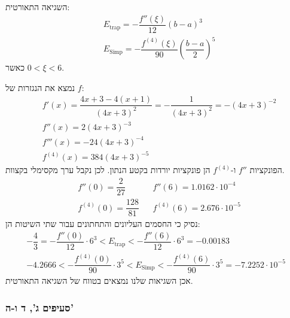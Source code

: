 \documentclass[
  a4paper,
]{article}
\begin{document}
השגיאה התאורטית: \[\begin{aligned}
 & E_{\text{trap}}=-\dfrac{f''(\xi)}{12}(b-a)^{3} \\[2ex]
 & E_{\text{Simp}}=-\dfrac{f^{(4)}(\xi)}{90}\left( \dfrac{b-a}{2} \right)^{5}
\end{aligned} \] כאשר \(0<\xi<6\).

נמצא את הנגזרות של \(f\): \[\begin{aligned}
 & f'(x)=\dfrac{4x+3-4(x+1)}{(4x+3)^{2}}=-\dfrac{1}{(4x+3)^{2}} =-(4x+3)^{-2}\\[1ex]
 & f''(x)=2(4x+3)^{-3} \\[1ex]
 & f'''(x)=-24(4x+3)^{-4} \\[1ex]
 & f^{(4)}(x)=384(4x+3)^{-5}
\end{aligned}\] הפונקציות \(f''\) ו-\(f^{(4)}\) הן פונקציות יורדות בקטע
הנתון. לכן נקבל ערך מקסימלי בקצוות. \[\begin{aligned}
 & f''(0)=\dfrac{2}{27} &  & f''(6)=1.0162\cdot 10^{-4}\\
 & f^{(4)}(0)=\dfrac{128}{81} &  & f^{(4)}(6)=2.676\cdot 10^{-5}
\end{aligned}\] נסיק כי החסמים העליונים והתחתונים עבור שתי השיטות הן:
\[\begin{gathered}
-\dfrac{4}{3}=-\dfrac{f''(0)}{12}\cdot 6^{3}<E_{\text{trap}}<-\dfrac{f''(6)}{12}\cdot 6^{3}=-0.00183 \\[2ex]
-4.2666<-\dfrac{f^{(4)}(0)}{90}\cdot 3^{5}<E_{\text{Simp}}<-\dfrac{f^{(4)}(6)}{90}\cdot 3^{5}=-7.2252\cdot 10^{-5}
\end{gathered}\] אכן השגיאות שלנו נמצאים בטווח של השגיאה התאורטית.

\subsubsection{סעיפים ג', ד
ו-ה'}\label{ux5e1ux5e2ux5d9ux5e4ux5d9ux5dd-ux5d2-ux5d3-ux5d5-ux5d4}
\end{document}
